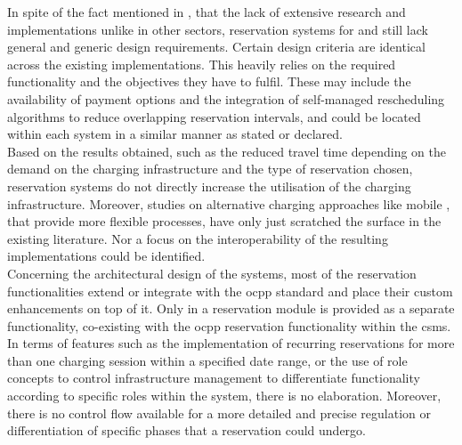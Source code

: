 \noindent In spite of the fact mentioned in \cite{basmadjian_interoperable_2019}, that the lack of extensive research and implementations unlike in other sectors, reservation systems for  and  still lack general and generic design requirements.
Certain design criteria are identical across the existing implementations. This heavily relies on the required functionality and the objectives they have to fulfil.
These may include the availability of payment options and the integration of self-managed rescheduling algorithms to reduce overlapping reservation intervals, and could be located within each system in a similar manner as stated or declared. \\
\noindent Based on the results obtained, such as the reduced travel time depending on the demand on the charging infrastructure and the type of reservation chosen, reservation systems do not directly increase the utilisation of the charging infrastructure.
Moreover, studies on alternative charging approaches like mobile , that provide more flexible processes, have only just scratched the surface in the existing literature. Nor a focus on the interoperability of the resulting implementations could be identified. \\
\noindent Concerning the architectural design of the systems, most of the reservation functionalities extend or integrate with the \acrshort{ocpp} standard and place their custom enhancements on top of it. Only in \cite{flocea_electric_2022} a reservation module is provided  as a separate functionality, co-existing with the \acrshort{ocpp} reservation functionality within the \acrshort{csms}.
In terms of features such as the implementation of recurring reservations for more than one charging session within a specified date range, or the use of role concepts to control infrastructure management to differentiate functionality according to specific roles within the system, there is no elaboration.
Moreover, there is no control flow available for a more detailed and precise regulation or differentiation of specific phases that a reservation could undergo. 
